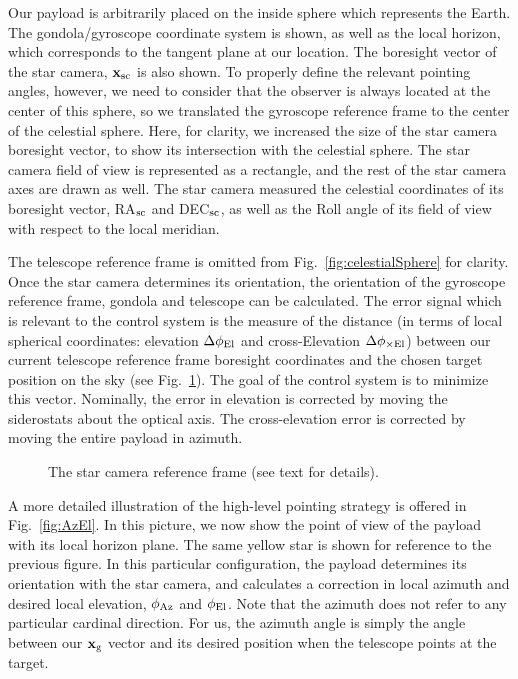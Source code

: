 Our payload is arbitrarily placed on the inside sphere which represents the Earth. The gondola/gyroscope coordinate system is shown, as well as the local horizon, which corresponds to the tangent plane at our location. The boresight vector of the star camera, $\textrm{\textbf{x}}_{\textrm{sc}}$ is also shown. To properly define the relevant pointing angles, however, we need to consider that the observer is always located at the center of this sphere, so we translated the gyroscope reference frame to the center of the celestial sphere. Here, for clarity, we increased the size of the star camera boresight vector, to show its intersection with the celestial sphere. The star camera field of view is represented as a rectangle, and the rest of the star camera axes are drawn as well. The star camera measured the celestial coordinates of its boresight vector, RA$_{\textrm{sc}}$ and DEC$_{\textrm{sc}}$, as well as the Roll angle of its field of view with respect to the local meridian. 






The telescope reference frame is omitted from Fig.~\ref{fig:celestialSphere} for clarity. Once the star camera determines its orientation, the orientation of the gyroscope reference frame, gondola and telescope can be calculated. The error signal which is relevant to the control system is the measure of the distance (in terms of local spherical coordinates: elevation $\Delta\phi_\textrm{El}$ and cross-Elevation $\Delta\phi_{\times\textrm{El}}$) between our current telescope reference frame boresight coordinates and the chosen target position on the sky (see Fig.~\ref{fig:starcamRefFrame}). The goal of the control system is to minimize this vector. Nominally, the error in elevation is corrected by moving the siderostats about the optical axis. The cross-elevation error is corrected by moving the entire payload in azimuth. 

\begin{figure}[!ht]
	\centering
	
	\caption[The star camera reference frame]{The star camera reference frame (see text for details).}
	\label{fig:starcamRefFrame}
    \end{figure}

A more detailed illustration of the high-level pointing strategy is offered in Fig.~\ref{fig:AzEl}. In this picture, we now show the point of view of the payload with its local horizon plane. The same yellow star is shown for reference to the previous figure. In this particular configuration, the payload determines its orientation with the star camera, and calculates a correction in local azimuth and desired local elevation, $\phi_\textrm{Az}$ and $\phi_\textrm{El}$. Note that the azimuth does not refer to any particular cardinal direction. For us, the azimuth angle is simply the angle between our $\textrm{\textbf{x}}_{\textrm{g}}$ vector and its desired position when the telescope points at the target. 


